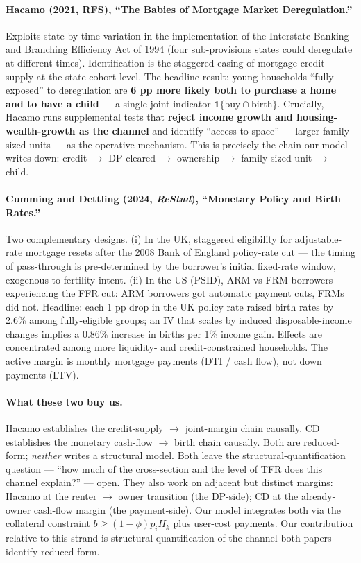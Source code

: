 \documentclass[11pt]{article}
\begin{document}
\paragraph{Hacamo (2021, RFS), ``The Babies of Mortgage Market Deregulation.''}
Exploits state-by-time variation in the implementation of the Interstate Banking and Branching Efficiency Act of 1994 (four sub-provisions states could deregulate at different times). Identification is the staggered easing of mortgage credit supply at the state-cohort level. The headline result: young households ``fully exposed'' to deregulation are \textbf{6 pp more likely both to purchase a home and to have a child} --- a single joint indicator $\mathbf{1}\{\mathrm{buy} \cap \mathrm{birth}\}$. Crucially, Hacamo runs supplemental tests that \textbf{reject income growth and housing-wealth-growth as the channel} and identify ``access to space'' --- larger family-sized units --- as the operative mechanism. This is precisely the chain our model writes down: credit $\to$ DP cleared $\to$ ownership $\to$ family-sized unit $\to$ child.

\paragraph{Cumming and Dettling (2024, \emph{ReStud}), ``Monetary Policy and Birth Rates.''}
Two complementary designs. (i) In the UK, staggered eligibility for adjustable-rate mortgage resets after the 2008 Bank of England policy-rate cut --- the timing of pass-through is pre-determined by the borrower's initial fixed-rate window, exogenous to fertility intent. (ii) In the US (PSID), ARM vs FRM borrowers experiencing the FFR cut: ARM borrowers got automatic payment cuts, FRMs did not. Headline: each 1 pp drop in the UK policy rate raised birth rates by 2.6\% among fully-eligible groups; an IV that scales by induced disposable-income changes implies a 0.86\% increase in births per 1\% income gain. Effects are concentrated among more liquidity- and credit-constrained households. The active margin is monthly mortgage payments (DTI / cash flow), not down payments (LTV).

\paragraph{What these two buy us.}
Hacamo establishes the credit-supply $\to$ joint-margin chain causally. CD establishes the monetary cash-flow $\to$ birth chain causally. Both are reduced-form; \emph{neither} writes a structural model. Both leave the structural-quantification question --- ``how much of the cross-section and the level of TFR does this channel explain?'' --- open. They also work on adjacent but distinct margins: Hacamo at the renter $\to$ owner transition (the DP-side); CD at the already-owner cash-flow margin (the payment-side). Our model integrates both via the collateral constraint $b \geq (1-\phi) p_i H_k$ plus user-cost payments. Our contribution relative to this strand is structural quantification of the channel both papers identify reduced-form.
\end{document}
